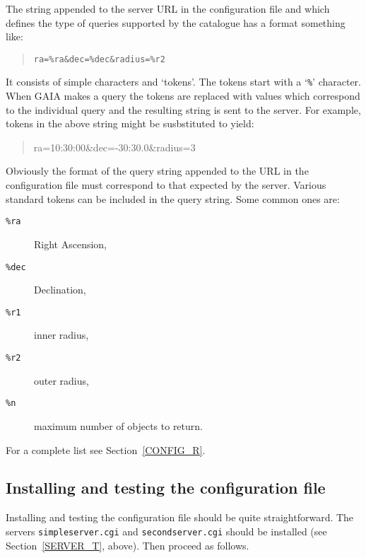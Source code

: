 \documentclass[twoside,11pt,nolof,chapters]{starlink}
\begin{document}
The string appended to the server URL in the configuration file and which
defines the type of queries supported by the catalogue has a format
something like:

\begin{quote}
\verb-ra=%ra&dec=%dec&radius=%r2-
\end{quote}

It consists of simple characters and `tokens'.  The tokens start with
a `\texttt{\%}' character.  When GAIA makes a query the tokens are replaced
with values which correspond to the individual query and the resulting
string is sent to the server.  For example, tokens in the above string
might be susbstituted to yield:

\begin{quote}
\begin{terminalv}
ra=10:30:00&dec=-30:30.0&radius=3
\end{terminalv}
\end{quote}

Obviously the format of the query string appended to the URL in the
configuration file must correspond to that expected by the server.
Various standard tokens can be included in the query string.  Some common
ones are:

\begin{description}

  \item[\texttt{\%ra}] Right Ascension,

  \item[\texttt{\%dec}] Declination,

  \item[\texttt{\%r1}] inner radius,

  \item[\texttt{\%r2}] outer radius,

  \item[\texttt{\%n}] maximum number of objects to return.

\end{description}

For a complete list see Section~\ref{CONFIG_R}.

\subsection{Installing and testing the configuration file}

Installing and testing the configuration file should be quite
straightforward.  The servers \newline
\texttt{simpleserver.cgi} and \texttt{secondserver.cgi} should be installed
(see Section~\ref{SERVER_T}, above).  Then proceed as follows.
\end{document}
